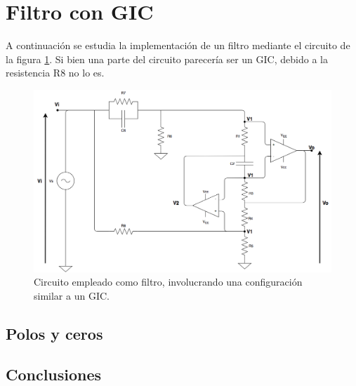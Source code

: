 
\section{Filtro con GIC}

A continuaci\'on se estudia la implementaci\'on de un filtro mediante el circuito de la figura \ref{circ1}. Si bien una parte del circuito parecer\'ia ser un GIC, debido a la resistencia R8 no lo es.

\begin{figure}[H] %
	\centering
	\includegraphics[scale=0.4]{../EJ1/circuito1.png}
	\caption{Circuito empleado como filtro, involucrando una configuraci\'on similar a un GIC.}
	\label{circ1}
\end{figure}





%

\subsection{Polos y ceros}







\subsection{Conclusiones}

